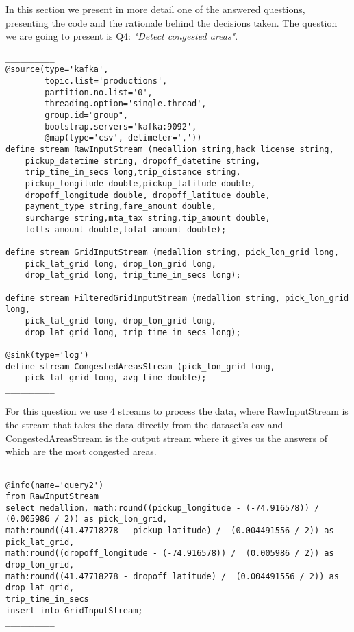 In this section we present in more detail one of the answered questions, presenting the code and the rationale behind the decisions taken. The question we are going to present is Q4: \textit{"Detect congested areas"}.\par
\small
\begin{lstlisting}
__________
@source(type='kafka',
        topic.list='productions',
        partition.no.list='0',
        threading.option='single.thread',
        group.id="group",
        bootstrap.servers='kafka:9092',
        @map(type='csv', delimeter=','))
define stream RawInputStream (medallion string,hack_license string,
	pickup_datetime string, dropoff_datetime string,
	trip_time_in_secs long,trip_distance string,
	pickup_longitude double,pickup_latitude double,
	dropoff_longitude double, dropoff_latitude double,
	payment_type string,fare_amount double,
	surcharge string,mta_tax string,tip_amount double,
	tolls_amount double,total_amount double);

define stream GridInputStream (medallion string, pick_lon_grid long, 
	pick_lat_grid long, drop_lon_grid long, 
	drop_lat_grid long, trip_time_in_secs long);

define stream FilteredGridInputStream (medallion string, pick_lon_grid long, 
	pick_lat_grid long, drop_lon_grid long, 
	drop_lat_grid long, trip_time_in_secs long);

@sink(type='log')
define stream CongestedAreasStream (pick_lon_grid long, 
	pick_lat_grid long, avg_time double);
__________
\end{lstlisting}

For this question we use 4 streams to process the data, where RawInputStream is the stream that takes the data directly from the dataset's csv and CongestedAreasStream is the output stream where it gives us the answers of which are the most congested areas.\par

\begin{lstlisting}
__________
@info(name='query2')
from RawInputStream
select medallion, math:round((pickup_longitude - (-74.916578)) /  (0.005986 / 2)) as pick_lon_grid, 
math:round((41.47718278 - pickup_latitude) /  (0.004491556 / 2)) as pick_lat_grid, 
math:round((dropoff_longitude - (-74.916578)) /  (0.005986 / 2)) as drop_lon_grid, 
math:round((41.47718278 - dropoff_latitude) /  (0.004491556 / 2)) as drop_lat_grid, 
trip_time_in_secs
insert into GridInputStream;
__________
\end{lstlisting}

